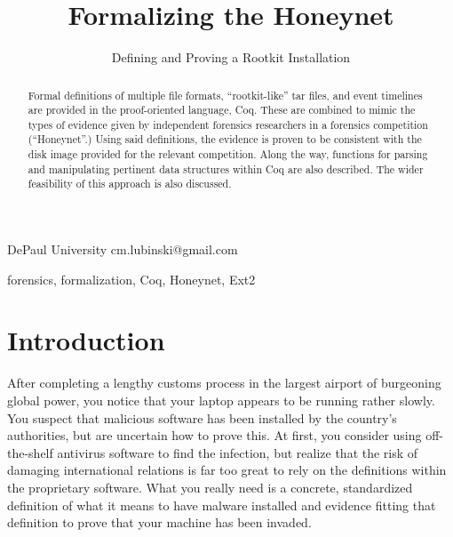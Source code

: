 \documentclass[nocopyrightspace]{sigplanconf}
\begin{document}
\lstset{language=coq, basicstyle=\ttfamily\scriptsize, columns=flexible,
keepspaces=true}

\setlength{\pdfpageheight}{\paperheight}
\setlength{\pdfpagewidth}{\paperwidth}



\title{Formalizing the Honeynet}
\subtitle{Defining and Proving a Rootkit Installation}

           {DePaul University}
           {cm.lubinski@gmail.com}

\maketitle

\begin{abstract}
Formal definitions of multiple file formats, ``rootkit-like'' tar files, and
event timelines are provided in the proof-oriented language, Coq. These are
combined to mimic the types of evidence given by independent forensics
researchers in a forensics competition (``Honeynet''.) Using said definitions,
the evidence is proven to be consistent with the disk image provided for the
relevant competition. Along the way, functions for parsing and manipulating
pertinent data structures within Coq are also described. The wider feasibility
of this approach is also discussed.
\end{abstract}

\keywords
forensics, formalization, Coq, Honeynet, Ext2

\section{Introduction}

After completing a lengthy customs process in the largest airport of
burgeoning global power, you notice that your laptop appears to be running
rather slowly. You suspect that malicious software has been installed by the
country's authorities, but are uncertain how to prove this. At first, you
consider using off-the-shelf antivirus software to find the infection, but
realize that the risk of damaging international relations is far too great to
rely on the definitions within the proprietary software. What you really need
is a concrete, standardized definition of what it means to have malware
installed and evidence fitting that definition to prove that your machine has
been invaded.
\end{document}
